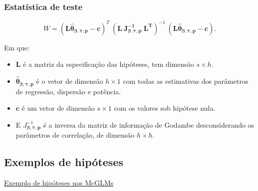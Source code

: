 \documentclass[10pt,
  aspectratio=169,
  serif,
  mathserif,
  professionalfont,
  compress,
  handout,
  ]{beamer}\usepackage[]{graphicx}\usepackage[]{color}
\begin{document}

\begin{frame}
\frametitle{Estatística de teste}

$$W = (\boldsymbol{L\hat\theta_{\beta,\tau,p}} - \boldsymbol{c})^T \ (\boldsymbol{L \ J_{\boldsymbol{{\beta,\tau,p}}}^{-1} \ L^T})^{-1} \ (\boldsymbol{L\hat\theta_{\beta,\tau,p}} - \boldsymbol{c}).$$

Em que: 

\begin{itemize}
  \item $\boldsymbol{L}$ é a matriz da especificação das hipóteses, tem dimensão $s \times h$. 

  \item $\boldsymbol{\hat\theta_{\beta,\tau,p}}$ é o vetor de dimensão $h \times 1$ com todas as estimativas dos parâmetros de regressão, dispersão e potência. 

  \item $\boldsymbol{c}$ é um vetor de dimensão $s \times 1$ com os valores sob hipótese nula. 

  \item E $J_{\boldsymbol{{\beta,\tau,p}}}^{-1}$ é a inversa da matriz de informação de Godambe desconsiderando os parâmetros de correlação, de dimensão $h \times h$. 

\end{itemize}

\end{frame}


\subsection{Exemplos de hipóteses}


\begin{frame}[c, allowframebreaks]

\begin{center}

  {\normalsize \href{https://lineu96.github.io/st/}{Exemplo de hipóteses nos McGLMs}}
  
\end{center}

\end{frame}
\end{document}
